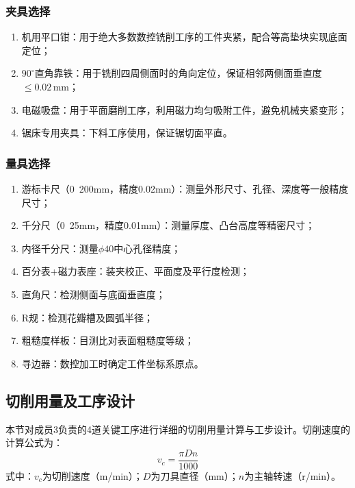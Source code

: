 \documentclass{xautCADreport}
\begin{document}
\subsubsection{夹具选择}

\begin{enumerate}
  \item 机用平口钳：用于绝大多数数控铣削工序的工件夹紧，配合等高垫块实现底面定位；
  \item $90^{\circ}$直角靠铁：用于铣削四周侧面时的角向定位，保证相邻两侧面垂直度$\leq0.02\,\mathrm{mm}$；
  \item 电磁吸盘：用于平面磨削工序，利用磁力均匀吸附工件，避免机械夹紧变形；
  \item 锯床专用夹具：下料工序使用，保证锯切面平直。
\end{enumerate}

\subsubsection{量具选择}

\begin{enumerate}
  \item 游标卡尺（0~200mm，精度0.02mm）：测量外形尺寸、孔径、深度等一般精度尺寸；
  \item 千分尺（0~25mm，精度0.01mm）：测量厚度、凸台高度等精密尺寸；
  \item 内径千分尺：测量$\phi40$中心孔径精度；
  \item 百分表+磁力表座：装夹校正、平面度及平行度检测；
  \item 直角尺：检测侧面与底面垂直度；
  \item R规：检测花瓣槽及圆弧半径；
  \item 粗糙度样板：目测比对表面粗糙度等级；
  \item 寻边器：数控加工时确定工件坐标系原点。
\end{enumerate}

\subsection{切削用量及工序设计}

本节对成员3负责的4道关键工序进行详细的切削用量计算与工步设计。切削速度的计算公式为：
\begin{equation}
  v_c = \frac{\pi D n}{1000}
  \label{eq:vc}
\end{equation}
\noindent 式中：$v_c$为切削速度（m/min）；$D$为刀具直径（mm）；$n$为主轴转速（r/min）。
\end{document}
